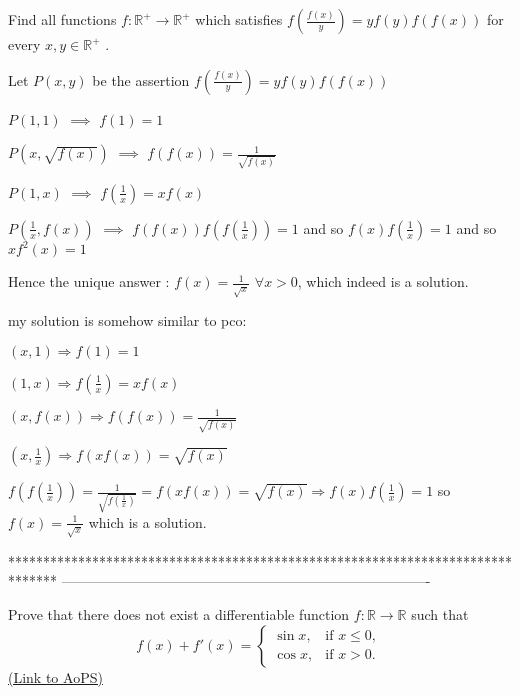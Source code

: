 \begin{solution}
	\begin{tcolorbox}Find all functions $ f : \mathbb{R}^+ \to \mathbb{R}^+ $ which satisfies
$ f (\frac{f(x)}{y})=yf(y)f(f(x)) $ for every $ x, y \in \mathbb{R}^+ $ .\end{tcolorbox}
Let $P(x,y)$ be the assertion $f\left(\frac {f(x)}y\right)=yf(y)f(f(x))$

$P(1,1)$ $\implies$ $f(1)=1$

$P(x,\sqrt{f(x)})$ $\implies$ $f(f(x))=\frac 1{\sqrt{f(x)}}$

$P(1,x)$ $\implies$ $f\left(\frac 1x\right)=xf(x)$

$P(\frac 1x,f(x))$ $\implies$ $f(f(x))f(f(\frac 1x))=1$ and so $f(x)f(\frac 1x)=1$ and so $xf^2(x)=1$

Hence the unique answer : $\boxed{f(x)=\frac 1{\sqrt x}}$ $\forall x>0$, which indeed is a solution.
\end{solution}



\begin{solution}
	my solution is somehow similar to pco:

$(x,1) \Longrightarrow f(1)=1$

$(1,x) \Longrightarrow f(\frac{1}{x})=xf(x)$

$(x,f(x)) \Longrightarrow f(f(x))=\frac{1}{\sqrt{f(x)}}$

$(x,\frac{1}{x}) \Longrightarrow f(xf(x))=\sqrt{f(x)}$

$f(f(\frac{1}{x}))=\frac{1}{\sqrt{f(\frac{1}{x})}}=f(xf(x))=\sqrt{f(x)} \Longrightarrow f(x)f(\frac{1}{x})=1$ so $f(x)=\frac{1}{\sqrt{x}}$ which is a solution.
\end{solution}
*******************************************************************************
-------------------------------------------------------------------------------

\begin{problem}
	Prove that there does not exist a differentiable function $f: \mathbb{R}\to\mathbb{R}$ such that
\[f(x)+f'(x)= \begin{cases} \sin x, & \mbox{if } x \leq 0, \\ \cos x, &\mbox{if } x>0. \end{cases}\]
	\flushright \href{https://artofproblemsolving.com/community/c6h446916}{(Link to AoPS)}
\end{problem}



